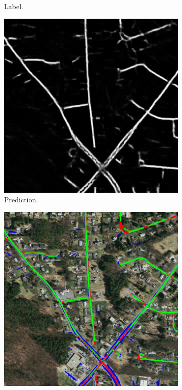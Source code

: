 \begin{figure}[H]
\begin{subfigure}{0.23\textwidth}
\caption{ Label. }
\vspace{0.2cm} %
\end{subfigure}
\hspace*{\fill} %
\begin{subfigure}{0.23\textwidth}
\includegraphics[width=\textwidth]{figs/appendix/pred11128870_15.jpg}
\caption{ Prediction. }
\vspace{0.2cm} %
\end{subfigure}
\hspace*{\fill} %
\begin{subfigure}{0.23\textwidth}
\includegraphics[width=\textwidth]{figs/appendix/hit11128870_15.jpg}

\end{subfigure}
\end{figure}
